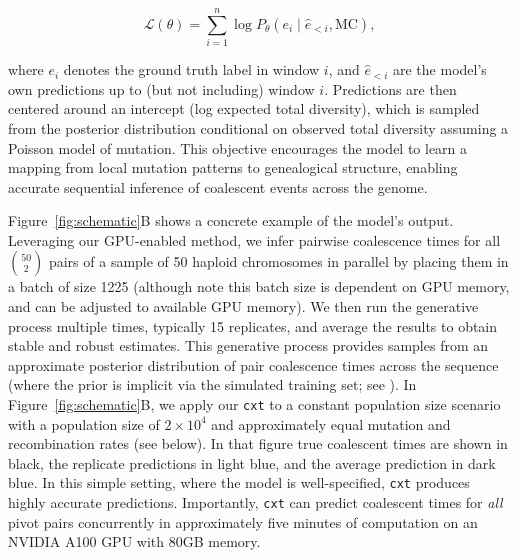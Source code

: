 \documentclass{article}
\newcommand{\cxtkit}{\texttt{cxt}\xspace}
\newcommand{\stdpopsim}{\texttt{stdpopsim}\xspace}
\begin{document}
\[
 \mathcal{L}(\theta) = \sum_{i=1}^{n} \log P_\theta(e_i \mid \hat{e}_{<i}, \text{MC}),
\]

where \( e_i \) denotes the ground truth label in window \( i \), and \( \hat{e}_{<i} \) 
are the model’s own predictions up to (but not including) window $i$. Predictions are then 
centered around an intercept (log expected total diversity), which is sampled from the 
posterior distribution conditional on observed total diversity assuming a Poisson model of 
mutation.
This objective encourages the model to learn a mapping from local mutation patterns to
genealogical structure, enabling accurate sequential inference of coalescent events across the genome.

Figure~\ref{fig:schematic}B shows a concrete example of the model's output. 
Leveraging our GPU-enabled method, we infer pairwise coalescence times for all \( \binom{50}{2} \) 
pairs of a sample of 50 haploid chromosomes in parallel by placing them in a batch of size 1225 (although note this batch size is dependent on GPU memory, and can be adjusted to available GPU memory). 
We then run the generative process multiple times, typically 15 replicates, and average the results to obtain stable and robust estimates. 
This generative process provides samples from an approximate posterior distribution of pair coalescence times across the sequence (where the prior is implicit via the simulated training set; see ).
In Figure~\ref{fig:schematic}B, we apply our \cxtkit to a constant population size scenario with a population size of \( 2 \times 10^{4} \) and approximately equal mutation and recombination rates (see  below). In that figure true coalescent times are shown in black, the replicate predictions in light blue, and the average prediction in dark blue. In this simple setting, where the model is well-specified, \cxtkit produces highly accurate predictions. Importantly, \cxtkit can predict coalescent times for \emph{all} pivot pairs concurrently in approximately five minutes of computation on an NVIDIA A100 GPU with 80GB memory.
\end{document}
